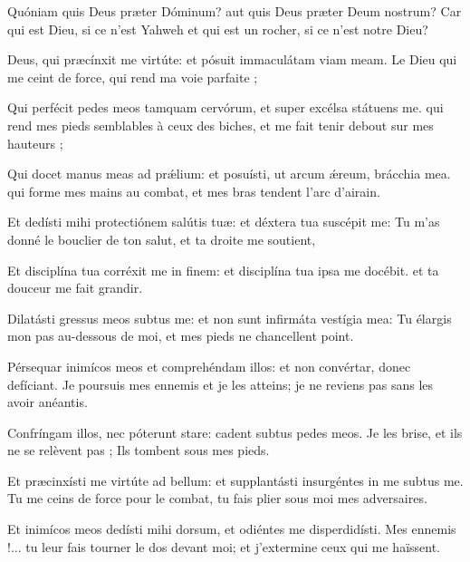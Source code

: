 
\begin{paracol}{2}

\LigneParacol{0cm}
{Quóniam quis Deus præter Dóminum? \GreStar{} aut quis Deus præter Deum nostrum?}
{Car qui est Dieu, si ce n'est Yahweh et qui est un rocher, si ce n'est notre Dieu? }

\LigneParacol{0.2cm}
{Deus, qui præcínxit me virtúte: \GreStar{} et pósuit immaculátam viam meam.}
{Le Dieu qui me ceint de force, qui rend ma voie parfaite ; }

\LigneParacol{0.2cm}
{Qui perfécit pedes meos tamquam cervórum, \GreStar{} et super excélsa státuens me.}
{qui rend mes pieds semblables à ceux des biches, et me fait tenir debout sur mes hauteurs ; }

\LigneParacol{0.2cm}
{Qui docet manus meas ad prǽlium: \GreStar{} et posuísti, ut arcum ǽreum, brácchia mea.}
{qui forme mes mains au combat, et mes bras tendent l'arc d'airain. }

\LigneParacol{0.2cm}
{Et dedísti mihi protectiónem salútis tuæ: \GreStar{} et déxtera tua suscépit me:}
{Tu m'as donné le bouclier de ton salut, et ta droite me soutient,}

\LigneParacol{0.2cm}
{Et disciplína tua corréxit me in finem: \GreStar{} et disciplína tua ipsa me docébit.}
{et ta douceur me fait grandir. }

\LigneParacol{0.2cm}
{Dilatásti gressus meos subtus me: \GreStar{} et non sunt infirmáta vestígia mea:}
{Tu élargis mon pas au-dessous de moi, et mes pieds ne chancellent point. }

\LigneParacol{0.2cm}
{Pérsequar inimícos meos et comprehéndam illos: \GreStar{} et non convértar, donec defíciant.}
{Je poursuis mes ennemis et je les atteins; je ne reviens pas sans les avoir anéantis. }

\LigneParacol{0.2cm}
{Confríngam illos, nec póterunt stare: \GreStar{} cadent subtus pedes meos.}
{Je les brise, et ils ne se relèvent pas ; Ils tombent sous mes pieds. }

\Gloria

\LigneParacol{0.2cm}
{Et præcinxísti me virtúte ad bellum: \GreStar{} et supplantásti insurgéntes in me subtus me.}
{Tu me ceins de force pour le combat, tu fais plier sous moi mes adversaires. }

\LigneParacol{0.2cm}
{Et inimícos meos dedísti mihi dorsum, \GreStar{} et odiéntes me disperdidísti.}
{Mes ennemis !... tu leur fais tourner le dos devant moi; et j'extermine ceux qui me haïssent. }


\end{paracol}
